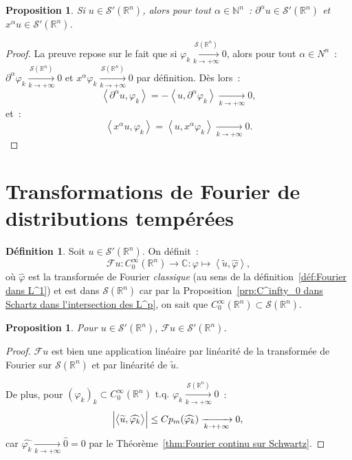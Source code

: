 \documentclass{report}
\newcommand{\C}{{\mathbb C}}
\newcommand{\R}{{\mathbb R}}
\newcommand{\N}{{\mathbb N}}
\newcommand{\scpr}[2]{\left\langle#1, #2\right\rangle}
\newcommand{\tq}{\text{ t.q. }}
\newcommand{\st}{\tq}
\newcommand{\pinfty}{{+\infty}}
\newtheorem{prp}[thm]{Proposition}
\theoremstyle{definition}
\newtheorem{déf}[thm]{Définition}
\theoremstyle{remark}
\begin{document}
\begin{prp} Si $u \in \mathcal S'(\R^n)$, alors pour tout $\alpha \in \N^n$~: $\partial^\alpha u \in \mathcal S'(\R^n)$ et $x^\alpha u \in \mathcal S'(\R^n)$.
\end{prp}

\begin{proof} La preuve repose sur le fait que si $\varphi_k \xrightarrow[k \to \pinfty]{\mathcal S(\R^n)} 0$, alors pour tout $\alpha \in N^n$~:
$\partial^\alpha \varphi_k \xrightarrow[k \to \pinfty]{\mathcal S(\R^n)} 0$ et $x^\alpha \varphi_k \xrightarrow[k \to \pinfty]{\mathcal S(\R^n)} 0$ par définition. Dès lors~:
\[\scpr {\partial^\alpha u}{\varphi_k} = -\scpr u{\partial^\alpha \varphi_k} \xrightarrow[k \to \pinfty]{} 0,\]
et~:
\[\scpr {x^\alpha u}{\varphi_k} = \scpr u{x^\alpha \varphi_k} \xrightarrow[k \to \pinfty]{} 0.\]
\end{proof}

\section{Transformations de Fourier de distributions tempérées}

\begin{déf} Soit $u \in \mathcal S'(\R^n)$. On définit~:
\[\mathcal Fu : C^\infty_0(\R^n) \to \C : \varphi \mapsto \scpr {\widetilde u}{\widehat \varphi},\]
où $\widehat \varphi$ est la transformée de Fourier \textit{classique} (au sens de la définition~\ref{déf:Fourier dans L^1}) et est dans $\mathcal S(\R^n)$ car
par la Proposition~\ref{prp:C^infty_0 dans Schartz dans l'intersection des L^p}, on sait que $C^\infty_0(\R^n) \subset \mathcal S(\R^n)$.
\end{déf}

\begin{prp} Pour $u \in \mathcal S'(\R^n)$, $\mathcal Fu \in \mathcal S'(\R^n)$.
\end{prp}

\begin{proof} $\mathcal Fu$ est bien une application linéaire par linéarité de la transformée de Fourier sur $\mathcal S(\R^n)$ et par linéarité de $\widetilde u$.

De plus, pour $(\varphi_k)_k \subset C^\infty_0(\R^n) \st \varphi_k \xrightarrow[k \to \pinfty]{\mathcal S(\R^n)} 0$~:
\[\abs {\scpr {\widetilde u}{\widehat {\varphi_k}}} \leq Cp_m(\widehat {\varphi_k}) \xrightarrow[k \to \pinfty]{} 0,\]
car $\widehat {\varphi_k} \xrightarrow[k \to \pinfty]{} \widehat 0 = 0$ par le Théorème~\ref{thm:Fourier continu sur Schwartz}.
\end{proof}
\end{document}
